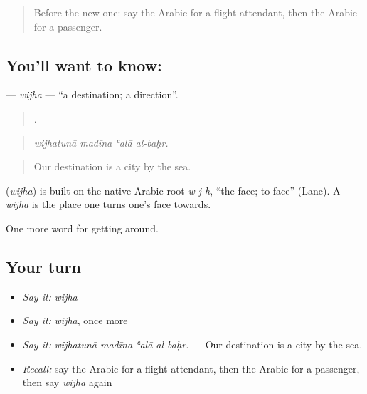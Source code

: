 \label{lesson:AR-C425-wijha}



\begin{quote}
Before the new one: say the Arabic for a flight attendant, then the Arabic for a passenger.
\end{quote}

\subsection*{You'll want to know: }
\textbf{} — \emph{wijha} — \textquotedblleft{}a destination; a direction\textquotedblright{}.

\begin{quote}
   .
\end{quote}

\begin{quote}
\emph{wijhatunā madīna ʿalā al-baḥr.}
\end{quote}

\begin{quote}
Our destination is a city by the sea.
\end{quote}

\begin{cousinweb}
\textbf{} (\emph{wijha}) is built on the native Arabic root \emph{w-j-h}, \textquotedblleft{}the face; to face\textquotedblright{} (Lane). A \emph{wijha} is the place one turns one's face towards.
\end{cousinweb}

\begin{grammarlens}[title={What you've built}]
One more word for getting around.
\end{grammarlens}

\subsection*{Your turn}
\begin{itemize}
\raggedright
  \item \emph{Say it:} \emph{wijha}
  \item \emph{Say it:} \emph{wijha}, once more
  \item \emph{Say it:} \emph{wijhatunā madīna ʿalā al-baḥr.} — Our destination is a city by the sea.
  \item \emph{Recall:} say the Arabic for a flight attendant, then the Arabic for a passenger, then say \emph{wijha} again
\end{itemize}

